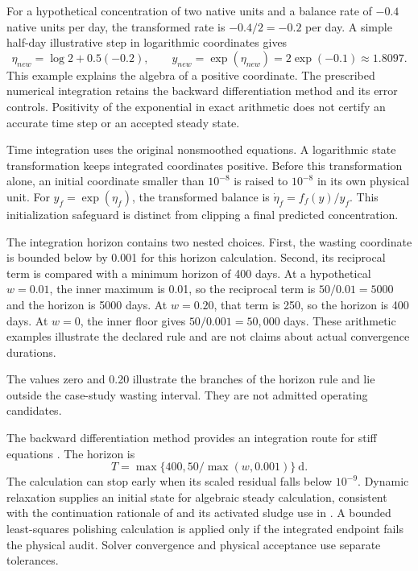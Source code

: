 For a hypothetical concentration of two native units and a balance rate of $-0.4$ native units per day, the transformed rate is $-0.4/2=-0.2$ per day. A simple half-day illustrative step in logarithmic coordinates gives
\[
\eta_{new}=\log2+0.5(-0.2),\qquad
y_{new}=\exp(\eta_{new})=2\exp(-0.1)\approx1.8097.
\]
This example explains the algebra of a positive coordinate. The prescribed numerical integration retains the backward differentiation method and its error controls. Positivity of the exponential in exact arithmetic does not certify an accurate time step or an accepted steady state.

Time integration uses the original nonsmoothed equations. A logarithmic state transformation keeps integrated coordinates positive. Before this transformation alone, an initial coordinate smaller than $10^{-8}$ is raised to $10^{-8}$ in its own physical unit. For $y_f=\exp(\eta_f)$, the transformed balance is $\dot\eta_f=f_f(y)/y_f$. This initialization safeguard is distinct from clipping a final predicted concentration.

The integration horizon contains two nested choices. First, the wasting coordinate is bounded below by 0.001 for this horizon calculation. Second, its reciprocal term is compared with a minimum horizon of 400 days. At a hypothetical $w=0.01$, the inner maximum is 0.01, so the reciprocal term is $50/0.01=5000$ and the horizon is 5000 days. At $w=0.20$, that term is 250, so the horizon is 400 days. At $w=0$, the inner floor gives $50/0.001=50{,}000$ days. These arithmetic examples illustrate the declared rule and are not claims about actual convergence durations.

The values zero and 0.20 illustrate the branches of the horizon rule and lie outside the case-study wasting interval. They are not admitted operating candidates.

The backward differentiation method provides an integration route for stiff equations \citep{CurtissHirschfelder1952}. The horizon is
\begin{equation}
T=\max\{400,50/\max(w,0.001)\}\ \mathrm{d}.
\label{eq:plant_integration_horizon}
\end{equation}
The calculation can stop early when its scaled residual falls below $10^{-9}$. Dynamic relaxation supplies an initial state for algebraic steady calculation, consistent with the continuation rationale of \citet{KelleyKeyes1998} and its activated sludge use in \citet{Selerio2026}. A bounded least-squares polishing calculation is applied only if the integrated endpoint fails the physical audit. Solver convergence and physical acceptance use separate tolerances.

